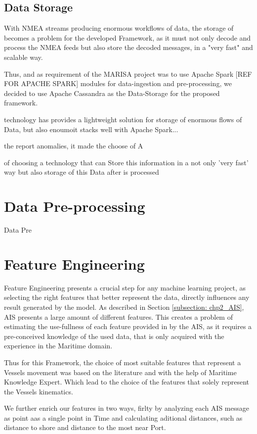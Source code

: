 \subsection{Data Storage}
With NMEA streams producing enormous workflows of data, the storage of becomes a problem for the developed Framework, as it must not only decode and process the NMEA feeds but also store the decoded messages, in a "very fast" and scalable way.

Thus, and as requirement of the MARISA project was to use Apache Spark [REF FOR APACHE SPARK] modules for data-ingestion and pre-processing, we decided to use Apache Cassandra as the Data-Storage for the proposed framework.

technology has provides a lightweight solution for storage of enormous flows of Data, but also 
enoumoit stacks well with Apache Spark...


the report anomalies, it made the choose of A

of choosing a technology that can Store this information in a not only 'very fast' way but also storage of this Data after is processed 

\section{Data Pre-processing}
Data Pre
\section{Feature Engineering}
Feature Engineering presents a crucial step for any machine learning project, as selecting the right features that better represent the data, directly influences any result generated by the model.  
As described in Section \ref{subsection: chp2_AIS}, AIS presents a large amount of different features. This creates a problem of estimating the use-fullness of each feature provided in by the AIS, as it requires a pre-conceived knowledge of the used data, that is only acquired with the experience in the Maritime domain.

Thus for this Framework, the choice of most suitable features that represent a Vessels movement was based on the literature and with the help of Maritime Knowledge Expert. Which lead to the choice of the features that solely represent the Vessels kinematics.

We further enrich our features in two ways, firlty by analyzing each AIS message as point aas a single point in Time and calculating aditional distances, such as distance to shore and distance to the most near Port.

